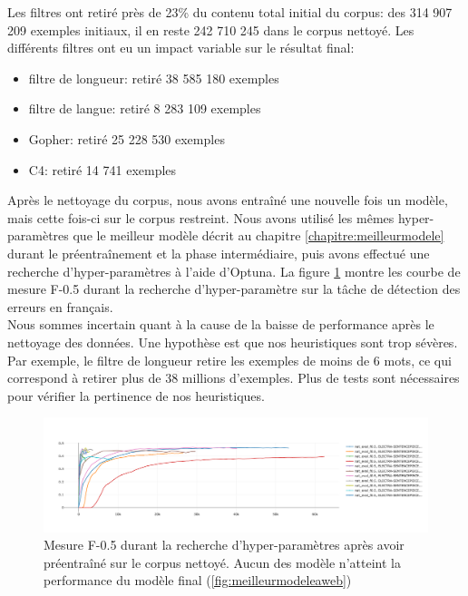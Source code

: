 \documentclass[12pt,twoside,maitrise]{dms}
\theoremstyle{definition}
\numberwithin{equation}{section}
\numberwithin{table}{chapter}
\numberwithin{figure}{chapter}
\begin{document}
Les filtres ont retiré près de 23\% du contenu total initial du corpus: des  314
907 209 exemples initiaux, il en reste 242 710 245 dans le corpus nettoyé. Les
différents filtres ont eu un impact variable sur le résultat final:
\begin{itemize}
	\item filtre de longueur: retiré 38 585 180 exemples
	\item filtre de langue: retiré 8 283 109 exemples
	\item Gopher: retiré 25 228 530 exemples
	\item C4: retiré 14 741 exemples
\end{itemize}
Après le nettoyage du corpus, nous avons entraîné une nouvelle fois un modèle,
mais cette fois-ci sur le corpus restreint. Nous avons utilisé les mêmes
hyper-paramètres que le meilleur modèle décrit au chapitre
\ref{chapitre:meilleurmodele} durant le préentraînement et la phase
intermédiaire, puis avons effectué une recherche d'hyper-paramètres à l'aide
d'Optuna. La figure \ref{fig:electrapropre} montre les courbe de mesure F-0.5
durant la recherche d'hyper-paramètre sur la tâche de détection des erreurs en
français.\\

Nous sommes incertain quant à la cause de la baisse de performance après le
nettoyage des données. Une hypothèse est que nos heuristiques sont trop
sévères. Par exemple, le filtre de longueur retire les exemples de moins de 6
mots, ce qui correspond à retirer plus de 38 millions d'exemples. Plus de tests
sont nécessaires pour vérifier la pertinence de nos heuristiques.


\begin{figure}
	\begin{center}
		\includegraphics[width=1.0\textwidth]{figures/electrasentenecepicepropreoptunaf05.png}
	\end{center}
	\caption{Mesure F-0.5 durant la recherche d'hyper-paramètres après avoir
		préentraîné sur le corpus nettoyé. Aucun des modèle n'atteint la
		performance du modèle final (\ref{fig:meilleurmodeleaweb})}
	\label{fig:electrapropre}
\end{figure}
\end{document}
